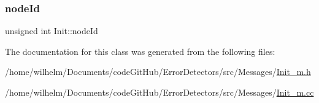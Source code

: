 \subsubsection{\texorpdfstring{node\+Id}{nodeId}}
{\footnotesize\ttfamily unsigned int Init\+::node\+Id\hspace{0.3cm}{\ttfamily [protected]}}



The documentation for this class was generated from the following files\+:\begin{DoxyCompactItemize}
\item 
/home/wilhelm/\+Documents/code\+Git\+Hub/\+Error\+Detectors/src/\+Messages/\hyperlink{_init__m_8h}{Init\+\_\+m.\+h}\item 
/home/wilhelm/\+Documents/code\+Git\+Hub/\+Error\+Detectors/src/\+Messages/\hyperlink{_init__m_8cc}{Init\+\_\+m.\+cc}\end{DoxyCompactItemize}
